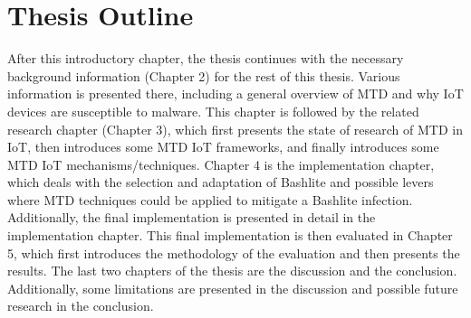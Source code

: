 \section{Thesis Outline}
After this introductory chapter, the thesis continues with the necessary background information (Chapter 2) for the rest of this thesis. Various information is presented there, including a general overview of MTD and why IoT devices are susceptible to malware. This chapter is followed by the related research chapter (Chapter 3), which first presents the state of research of MTD in IoT, then introduces some MTD IoT frameworks, and finally introduces some MTD IoT mechanisms/techniques. Chapter 4 is the implementation chapter, which deals with the selection and adaptation of Bashlite and possible levers where MTD techniques could be applied to mitigate a Bashlite infection. Additionally, the final implementation is presented in detail in the implementation chapter. This final implementation is then evaluated in Chapter 5, which first introduces the methodology of the evaluation and then presents the results. The last two chapters of the thesis are the discussion and the conclusion. Additionally, some limitations are presented in the discussion and possible future research in the conclusion. 
